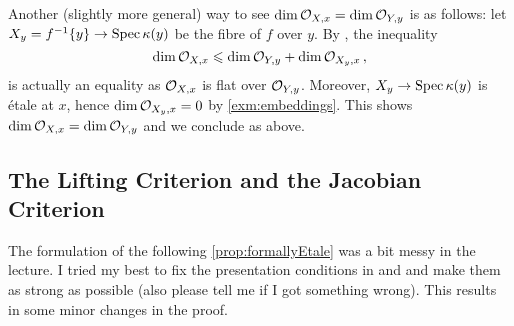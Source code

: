 \begin{rem*}\label{rem*:dimension}
	Another (slightly more general) way to see $\dim \mathcal{O}_{X,x}=\dim\mathcal{O}_{Y,y}$ is as follows: let $X_y=f^{-1}\{y\}\morphism\Spec \kappa(y)$ be the fibre of $f$ over $y$. By \cite[]{stacks-project}, the inequality
	\begin{equation*}
		\dim\mathcal{O}_{X,x}\leqslant\dim\mathcal{O}_{Y,y}+\dim\mathcal{O}_{X_y,x}\,,
	\end{equation*}
	is actually an equality as $\mathcal{O}_{X,x}$ is flat over $\mathcal{O}_{Y,y}$. Moreover, $X_y\morphism \Spec \kappa(y)$ is étale at $x$, hence $\dim \mathcal{O}_{X_y,x}=0$ by \cref{exm:embeddings}. This shows $\dim \mathcal{O}_{X,x}=\dim\mathcal{O}_{Y,y}$ and we conclude as above.
\end{rem*}
\subsection{The Lifting Criterion and the Jacobian Criterion}
The formulation of the following \cref{prop:formallyEtale} was a bit messy in the lecture. I tried my best to fix the presentation conditions in  and  and make them as strong as possible (also please tell me if I got something wrong). This results in some minor changes in the proof.
